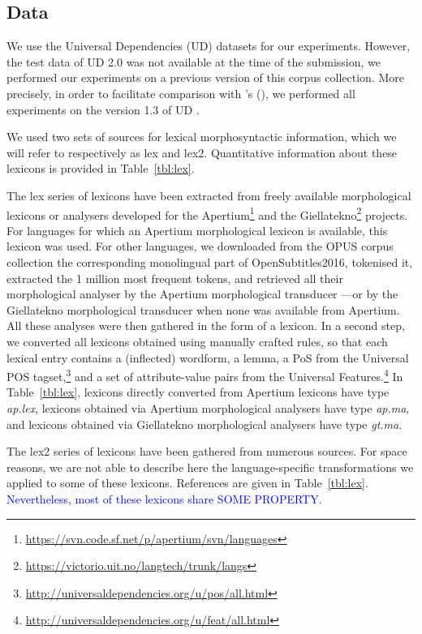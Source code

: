 \documentclass[11pt,letterpaper]{article}
\begin{document}
\subsection{Data}

We use the Universal Dependencies (UD) datasets for our experiments. However, the test data of UD 2.0 was not available
at the time of the submission, we performed our experiments on a previous version of this corpus collection. More
precisely, in order to facilitate comparison with \citeauthor{plank16}'s (\citeyear{plank16}), we performed all
experiments on the version 1.3 of UD \cite{ud13}.

We used two sets of sources for lexical morphosyntactic information, which we will refer to respectively as {\sc lex}
and {\sc lex2}. Quantitative information about these lexicons is provided in Table~\ref{tbl:lex}.

The {\sc lex} series of lexicons have been extracted from freely available morphological lexicons or analysers developed
for the Apertium\footnote{\url{https://svn.code.sf.net/p/apertium/svn/languages}} and the
Giellatekno\footnote{\url{https://victorio.uit.no/langtech/trunk/langs}} projects. For languages for which an Apertium
morphological lexicon is available, this lexicon was used. For other languages, we downloaded from the OPUS corpus
collection the corresponding monolingual part of OpenSubtitles2016, tokenised it, extracted the 1 million most frequent
tokens, and retrieved all their morphological analyser by the Apertium morphological transducer ---or by the Giellatekno
morphological transducer when none was available from Apertium. All these analyses were then gathered in the form of a
lexicon. In a second step, we converted all lexicons obtained using manually crafted rules, so that each lexical entry
contains a (inflected) wordform, a lemma, a PoS from the Universal POS
tagset,\footnote{\url{http://universaldependencies.org/u/pos/all.html}} and a set of attribute-value pairs from the
Universal Features.\footnote{\url{http://universaldependencies.org/u/feat/all.html}} In Table~\ref{tbl:lex}, lexicons
directly converted from Apertium lexicons have type {\em ap.lex}, lexicons obtained via Apertium morphological analysers
have type {\em ap.ma}, and lexicons obtained via Giellatekno morphological analysers have type {\em gt.ma}.

The {\sc lex2} series of lexicons have been gathered from numerous sources. For space reasons, we are not able to describe
here the language-specific transformations we applied to some of these lexicons. References are given in
Table~\ref{tbl:lex}. \textcolor{blue}{Nevertheless, most of these lexicons share SOME PROPERTY. }
\end{document}
